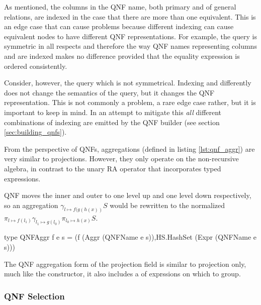 As mentioned, the columns in the QNF name, both primary and of general
relations, are indexed in the case that there are more than one
equivalent. This is an edge case that can cause problems because
different indexing can cause equivalent nodes to have different QNF
representations. For example, the query  is symmetric in all respects and therefore
the way QNF names representing columns  and  are
indexed makes no difference provided that the equality expression
 is ordered consistently.


Consider, however, the query  which is not symmetrical. Indexing  and
 differently does not change the semantics of the query, but
it changes the QNF representation. This is not commonly a problem, a
rare edge case rather, but it is important to keep in mind.  In an
attempt to mitigate this \emph{all} different combinations of indexing
are emitted by the QNF builder (see section \ref{sec:building_qnfs}).

From the perspective of QNFs, aggregations (defined in listing
\ref{lst:qnf_aggr}) are very similar to projections. However, they
only operate on the non-recursive  algebra, in contrast to
the  unary RA operator that incorporates  typed expressions.

QNF moves the inner and outer  to one level up and one
level down respectively, so an aggregation \(\gamma_{l \mapsto
f(g(h(x))} S\) would be rewritten to the normalized \(\pi_{l \mapsto
f(l_1)} \gamma_{l_1 \mapsto g(l_0)} \pi_{l_0 \mapsto h(x)} S\).

\begin{code}
  \begin{haskellcode}
    type QNFAggr f e s =
    (f (Aggr (QNFName e s)),HS.HashSet (Expr (QNFName e s)))
  \end{haskellcode}
  \caption{\label{lst:qnf_aggr} The QNF aggregation form of the
    projection field is similar to projection only, much like the
     constructor, it also includes a  of
    exprssions on which to group.}
\end{code}

\subsubsection{QNF Selection}

